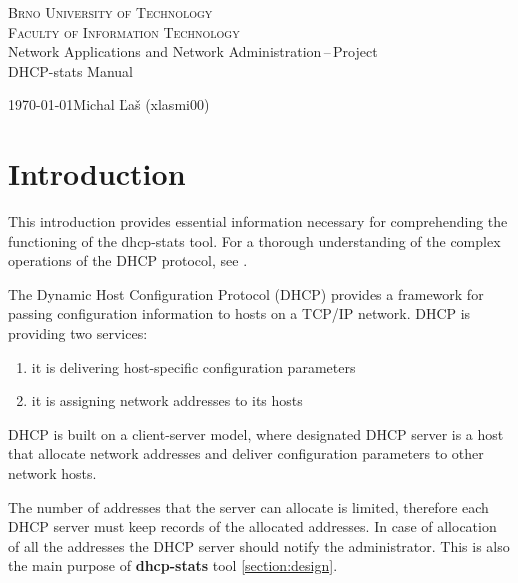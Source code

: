 \documentclass[a4paper, 11pt, a4paper]{article}
\begin{document}
\begin{titlepage}
    \begin{center}
            \textsc{\Huge Brno University of Technology \\}
            \vspace{0.5em}
            \textsc{\huge Faculty of Information Technology \\}
            {\LARGE Network Applications and Network Administration\,--\,Project \\ 
            \vspace{0.4em}
            \Huge DHCP-stats Manual}
    \end{center}
    {\Large \today \hfill Michal Ľaš (xlasmi00)}
\end{titlepage}

\tableofcontents
\newpage

\section{Introduction}

This introduction provides essential information necessary for comprehending the functioning of the dhcp-stats tool. 
For a thorough understanding of the complex operations of the DHCP protocol, see \cite{rfc2131}.

\bigskip

\noindent The Dynamic Host Configuration Protocol (DHCP) provides a framework
for passing configuration information to hosts on a TCP/IP network.
DHCP is providing two services:

\begin{enumerate}
    \item it is delivering host-specific configuration parameters
    \item it is assigning network addresses to its hosts
\end{enumerate}

\noindent DHCP is built on a client-server model, where designated DHCP server
is a host that allocate network addresses and deliver configuration parameters to other network hosts.\cite{rfc2131}

\noindent The number of addresses that the server can allocate is limited, therefore each DHCP server must keep records of the allocated addresses. 
In case of allocation of all the addresses the DHCP server should notify the administrator.
This is also the main purpose of \textbf{dhcp-stats} tool \ref{section:design}.
\end{document}
